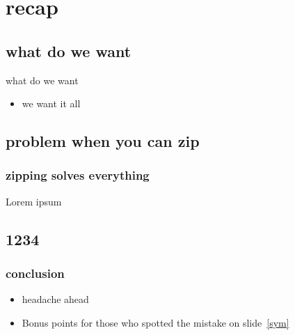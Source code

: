 \documentclass{beamer}
\begin{document}
\section{recap}
\subsection{what do we want}

\begin{frame}{what do we want}
  \begin{itemize}
      \item we want it all
  \end{itemize}
\end{frame}

\begingroup
{}
\subsection[problem when you can zip]{problem when you can zip}
\endgroup

\begin{frame}
  \frametitle{zipping solves everything}
  Lorem ipsum
\end{frame}

\subsection{1234}

\begin{frame}
  \frametitle{conclusion}
  \begin{itemize}
    \item headache ahead
    \item<2-> Bonus points for those who spotted the mistake on slide~\ref{sym}
  \end{itemize}
\end{frame}
\end{document}
